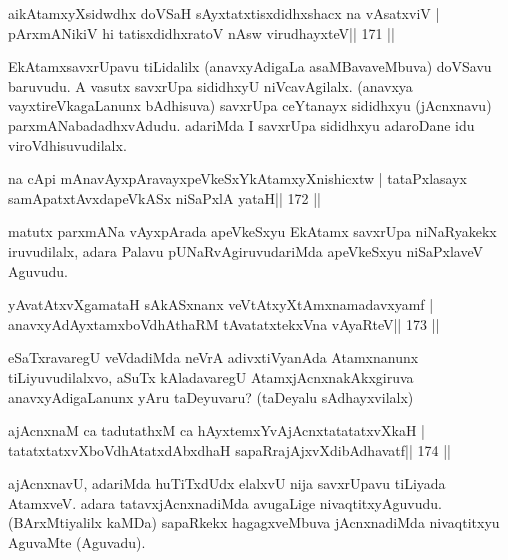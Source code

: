 
\begin{shl}
aikAtamxyXsidwdhx doVSaH sAyxtatxtisxdidhxshacx na vAsatxviV |
pArxmANikiV hi tatisxdidhxratoV nAsw virudhayxteV\hfill || 171 ||
\end{shl}

\begin{artha}
EkAtamxsavxrUpavu tiLidalilx (anavxyAdigaLa asaMBavaveMbuva) doVSavu 
baruvudu. A vasutx savxrUpa sididhxyU niVcavAgilalx. (anavxya 
vayxtireVkagaLanunx bAdhisuva) savxrUpa ceYtanayx sididhxyu (jAcnxnavu) parxmANabadadhxvAdudu. adariMda I savxrUpa sididhxyu adaroDane idu viroVdhisuvudilalx.
\end{artha}

\begin{shl}
na cApi mAnavAyxpAravayxpeVkeSxYkAtamxyXnishicxtw |
tataPxlasayx samApatxtAvxdapeVkASx niSaPxlA yataH\hfill || 172 ||
\end{shl}

\begin{artha}
matutx parxmANa vAyxpArada apeVkeSxyu EkAtamx savxrUpa niNaRyakekx iruvudilalx, adara Palavu pUNaRvAgiruvudariMda apeVkeSxyu niSaPxlaveV Aguvudu.
\end{artha}

\begin{shl}
yAvatAtxvXgamataH sAkASxnanx veVtAtxyXtAmxnamadavxyamf |
anavxyAdAyxtamxboVdhAthaRM tAvatatxtekxVna vAyaRteV\hfill || 173 ||
\end{shl}

\begin{artha}
eSaTxravaregU veVdadiMda neVrA adivxtiVyanAda Atamxnanunx tiLiyuvudilalxvo, aSuTx kAladavaregU AtamxjAcnxnakAkxgiruva anavxyAdigaLanunx yAru taDeyuvaru? (taDeyalu sAdhayxvilalx)
\end{artha}

\begin{shl}
ajAcnxnaM ca tadutathxM ca hAyxtemxYvAjAcnxtatatatxvXkaH |
tatatxtatxvXboVdhAtatxdAbxdhaH sapaRrajAjxvXdibAdhavatf\hfill || 174 ||
\end{shl}

\begin{artha}
ajAcnxnavU, adariMda huTiTxdUdx elalxvU nija savxrUpavu tiLiyada  AtamxveV. adara tatavxjAcnxnadiMda avugaLige nivaqtitxyAguvudu.  (BArxMtiyalilx kaMDa) sapaRkekx hagagxveMbuva jAcnxnadiMda nivaqtitxyu  AguvaMte (Aguvadu).
\end{artha}

